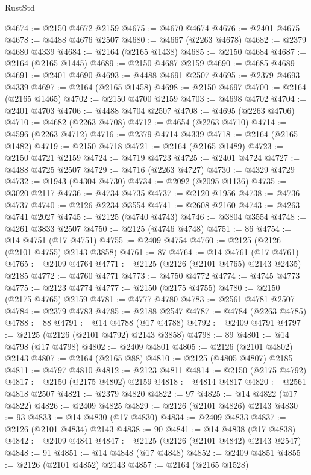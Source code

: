 \begin{lexlean}{RustStd}
\begin{coremodule}
@4674 := @2150 @4672 @2159
@4675 := @4670 @4674
@4676 := @2401 @4675
@4678 := @4488 @4676 @2507
@4680 := @4667 (@2263 @4678)
@4682 := @2379 @4680 @4339
@4684 := @2164 (@2165 @1438)
@4685 := @2150 @4684
@4687 := @2164 (@2165 @1445)
@4689 := @2150 @4687 @2159
@4690 := @4685 @4689
@4691 := @2401 @4690
@4693 := @4488 @4691 @2507
@4695 := @2379 @4693 @4339
@4697 := @2164 (@2165 @1458)
@4698 := @2150 @4697
@4700 := @2164 (@2165 @1465)
@4702 := @2150 @4700 @2159
@4703 := @4698 @4702
@4704 := @2401 @4703
@4706 := @4488 @4704 @2507
@4708 := @4695 (@2263 @4706)
@4710 := @4682 (@2263 @4708)
@4712 := @4654 (@2263 @4710)
@4714 := @4596 (@2263 @4712)
@4716 := @2379 @4714 @4339
@4718 := @2164 (@2165 @1482)
@4719 := @2150 @4718
@4721 := @2164 (@2165 @1489)
@4723 := @2150 @4721 @2159
@4724 := @4719 @4723
@4725 := @2401 @4724
@4727 := @4488 @4725 @2507
@4729 := @4716 (@2263 @4727)
@4730 := @4329 @4729
@4732 := @1943 (@4304 @4730)
@4734 := @2092 (@2095 @1136)
@4735 := @3020 @2117
@4736 := @4734 @4735
@4737 := @2120 @1956
@4738 := @4736 @4737
@4740 := @2126 @2234 @3554
@4741 := @2608 @2160
@4743 := @4263 @4741 @2027
@4745 := @2125 (@4740 @4743)
@4746 := @3804 @3554
@4748 := @4261 @3833 @2507
@4750 := @2125 (@4746 @4748)
@4751 := 86
@4754 := @14 @4751 (@17 @4751)
@4755 := @2409 @4754
@4760 := @2125 (@2126 (@2101 @4755) @2143 @3858)
@4761 := 87
@4764 := @14 @4761 (@17 @4761)
@4765 := @2409 @4764
@4771 := @2125 (@2126 (@2101 @4765) @2143 @2435) @2185
@4772 := @4760 @4771
@4773 := @4750 @4772
@4774 := @4745 @4773
@4775 := @2123 @4774
@4777 := @2150 (@2175 @4755)
@4780 := @2150 (@2175 @4765) @2159
@4781 := @4777 @4780
@4783 := @2561 @4781 @2507
@4784 := @2379 @4783
@4785 := @2188 @2547
@4787 := @4784 (@2263 @4785)
@4788 := 88
@4791 := @14 @4788 (@17 @4788)
@4792 := @2409 @4791
@4797 := @2125 (@2126 (@2101 @4792) @2143 @3858)
@4798 := 89
@4801 := @14 @4798 (@17 @4798)
@4802 := @2409 @4801
@4805 := @2126 (@2101 @4802) @2143
@4807 := @2164 (@2165 @88)
@4810 := @2125 (@4805 @4807) @2185
@4811 := @4797 @4810
@4812 := @2123 @4811
@4814 := @2150 (@2175 @4792)
@4817 := @2150 (@2175 @4802) @2159
@4818 := @4814 @4817
@4820 := @2561 @4818 @2507
@4821 := @2379 @4820
@4822 := 97
@4825 := @14 @4822 (@17 @4822)
@4826 := @2409 @4825
@4829 := @2126 (@2101 @4826) @2143
@4830 := 93
@4833 := @14 @4830 (@17 @4830)
@4834 := @2409 @4833
@4837 := @2126 (@2101 @4834) @2143
@4838 := 90
@4841 := @14 @4838 (@17 @4838)
@4842 := @2409 @4841
@4847 := @2125 (@2126 (@2101 @4842) @2143 @2547)
@4848 := 91
@4851 := @14 @4848 (@17 @4848)
@4852 := @2409 @4851
@4855 := @2126 (@2101 @4852) @2143
@4857 := @2164 (@2165 @1528)

\end{coremodule}
\end{lexlean}
